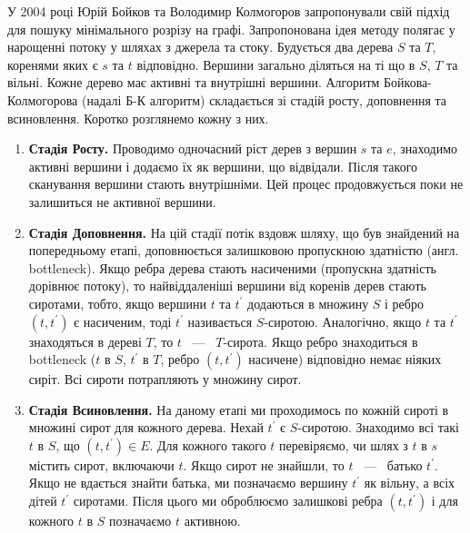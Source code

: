 У 2004 році Юрій Бойков та Володимир Колмогоров запропонували свій підхід \cite{boykov_kolmogorov}
для пошуку мінімального розрізу на графі.
Запропонована ідея методу полягає у нарощенні потоку у шляхах з джерела та стоку.
Будується два дерева $S$ та $T$, коренями яких є $s$ та $t$ відповідно.
Вершини загально діляться на ті що в $S$, $T$ та
вільні. Кожне дерево має активні та внутрішні вершини.
Алгоритм Бойкова-Колмогорова (надалі Б-К алгоритм) складається зі стадій росту,
доповнення та всиновлення.
Коротко розглянемо кожну з них.
\begin{enumerate}
    \item \textbf{Стадія Росту.}
          Проводимо одночасний ріст дерев з вершин $s$ та $e$, знаходимо активні
          вершини і додаємо їх як вершини, що відвідали. Після такого сканування вершини
          стають внутрішніми. Цей процес продовжується поки не залишиться не активної вершини.
    \item \textbf{Стадія Доповнення.}
          На цій стадії потік вздовж шляху, що був знайдений на попередньому етапі,
          доповнюється залишковою пропускною здатністю (англ. bottleneck). Якщо ребра дерева стають
          насиченими (пропускна здатність дорівнює потоку), то найвіддаленіші вершини від коренів дерев стають
          сиротами, тобто, якщо вершини $t$ та $t^{'}$ додаються в множину $S$
          і ребро $(t,t^{'})$ є насиченим, тоді $t^{'}$ називається $S$-сиротою.
          Аналогічно, якщо $t$ та $t^{'}$ знаходяться в дереві $T$, то  $t$ ~---~ $T$-сирота.
          Якщо ребро знаходиться в bottleneck ($t$ в $S$, $t^{'}$ в $T$, ребро $(t,t^{'})$
          насичене) відповідно немає ніяких сиріт. Всі сироти потрапляють у множину сирот.
    \item \textbf{Стадія Всиновлення.}
          На даному етапі ми проходимось по кожній сироті в множині сирот для кожного дерева.
          Нехай $t^{'}$ є $S$-сиротою. Знаходимо всі такі $t$  в $S$, що
          $(t, t^{'}) \in E$. Для кожного такого $t$ перевіряємо, чи шлях з $t$ в $s$ містить сирот,
          включаючи $t$. Якщо сирот не знайшли, то $t$ ~---~ батько  $t^{'}$.
          Якщо не вдається знайти батька, ми позначаємо вершину $t^{'}$ як вільну, а всіх
          дітей $t^{'}$ сиротами. Після цього ми оброблюємо залишкові ребра $(t,t^{'})$ і для кожного $t$ в $S$ позначаємо
          $t$ активною.
\end{enumerate}

